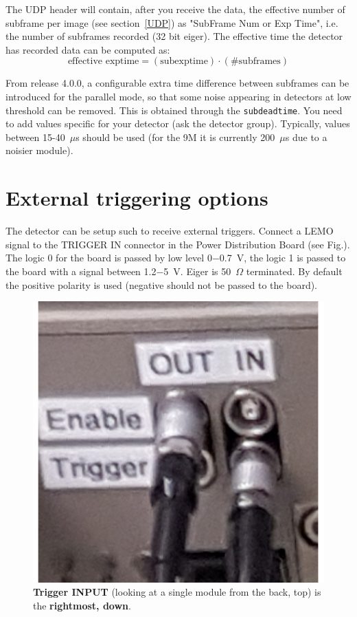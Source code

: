 \documentclass{article}
\begin{document}
The UDP header will contain, after you receive the data, the effective number of subframe per image (see section~\ref{UDP}) as  "SubFrame Num or Exp Time", i.e. the number of subframes recorded  (32 bit eiger).
The effective time the detector has recorded data can be computed as:
\begin{equation}
\textrm{effective exptime}=(\textrm{subexptime})\cdot (\textrm{\# subframes})
\end{equation}

 From release 4.0.0, a configurable extra time difference between subframes can be introduced for the parallel mode, so that some noise appearing in detectors at low threshold can be removed. This is obtained through the {\tt{subdeadtime}}. You need to add values specific for your detector (ask the detector group). Typically, values between 15-40~$\mu$s should be used (for the 9M it is currently 200~$\mu$s due to a noisier module).



\section{External triggering options}\label{triggering}
The detector can be setup such to receive external triggers. Connect a LEMO signal to the TRIGGER IN connector in the Power Distribution Board (see Fig.). The logic 0 for the board is passed by low level 0$-$0.7~V, the logic 1 is passed to the board with a signal between 1.2$-$5~V. Eiger is 50~$\Omega$ terminated. By default the positive polarity is used (negative should not be passed to the board).

\begin{figure}[t]
\begin{center}
\includegraphics[width=.4\textwidth]{tiggerIN}
\end{center}
\caption{\textbf{Trigger INPUT} (looking at a single module from the back, top) is the \textbf{rightmost, down}.}
\label{triggerIN}
\end{figure}
\end{document}
